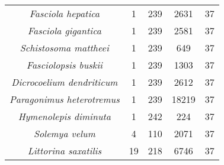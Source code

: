 \begin{longtable}[c]{|c|c|c|c|c|}
\textit{Fasciola hepatica}         & 1  & 239 & 2631  & 37 \\
\textit{Fasciola gigantica}        & 1  & 239 & 2581  & 37 \\
\textit{Schistosoma mattheei}      & 1  & 239 & 649   & 37 \\
\textit{Fasciolopsis buskii}       & 1  & 239 & 1303  & 37 \\
\textit{Dicrocoelium dendriticum}  & 1  & 239 & 2612  & 37 \\
\textit{Paragonimus heterotremus}  & 1  & 239 & 18219 & 37 \\
\textit{Hymenolepis diminuta}      & 1  & 242 & 224   & 37 \\
\textit{Solemya velum}             & 4  & 110 & 2071  & 37 \\
\textit{Littorina saxatilis}       & 19 & 218 & 6746  & 37 \\ \hline
\end{longtable}


